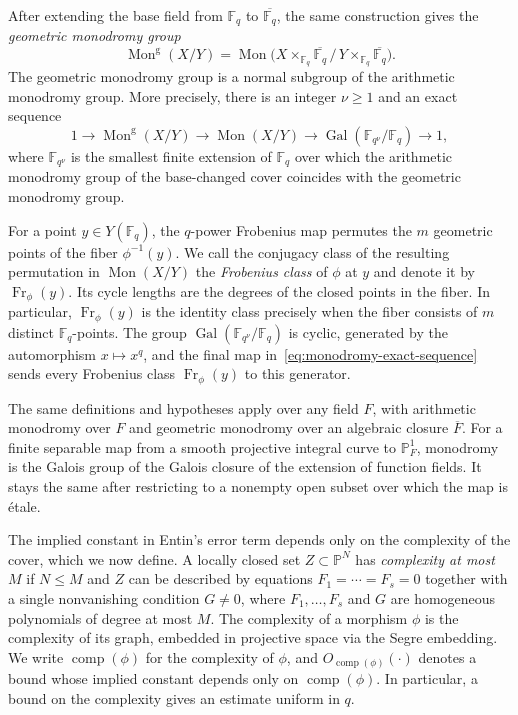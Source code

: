 \documentclass[12pt,reqno]{amsart}
\theoremstyle{definition}
\theoremstyle{remark}
\newcommand{\bF}{\mathbb{F}}
\newcommand{\Fq}{\mathbb{F}_q}
\newcommand{\bP}{\mathbb{P}}
\begin{document}
After extending the base field from $\Fq$ to $\overline{\Fq}$, the same construction gives the \emph{geometric monodromy group}
\[
\operatorname{Mon}^{\mathrm{g}}(X/Y)
=
\operatorname{Mon}\bigl(X\times_{\Fq}\overline{\Fq}\,/\,Y\times_{\Fq}\overline{\Fq}\bigr).
\]
The geometric monodromy group is a normal subgroup of the arithmetic monodromy group. More precisely, there is an integer $\nu\geq 1$ and an exact sequence
\begin{equation}\label{eq:monodromy-exact-sequence}
1\longrightarrow \operatorname{Mon}^{\mathrm{g}}(X/Y)
\longrightarrow \operatorname{Mon}(X/Y)
\longrightarrow \operatorname{Gal}(\bF_{q^\nu}/\Fq)
\longrightarrow 1,
\end{equation}
where $\bF_{q^\nu}$ is the smallest finite extension of $\Fq$ over which the arithmetic monodromy group of the base-changed cover coincides with the geometric monodromy group.

For a point $y\in Y(\Fq)$, the $q$-power Frobenius map permutes the $m$ geometric points of the fiber $\phi^{-1}(y)$. We call the conjugacy class of the resulting permutation in $\operatorname{Mon}(X/Y)$ the \emph{Frobenius class} of $\phi$ at $y$ and denote it by $\operatorname{Fr}_{\phi}(y)$. Its cycle lengths are the degrees of the closed points in the fiber. In particular, $\operatorname{Fr}_{\phi}(y)$ is the identity class precisely when the fiber consists of $m$ distinct $\Fq$-points. The group $\operatorname{Gal}(\bF_{q^\nu}/\Fq)$ is cyclic, generated by the automorphism $x\mapsto x^q$, and the final map in~\eqref{eq:monodromy-exact-sequence} sends every Frobenius class $\operatorname{Fr}_{\phi}(y)$ to this generator. 

The same definitions and hypotheses apply over any field $F$, with arithmetic monodromy over $F$ and geometric monodromy over an algebraic closure $\overline F$. For a finite separable map from a smooth projective integral curve to $\bP^1_F$, monodromy is the Galois group of the Galois closure of the extension of function fields. It stays the same after restricting to a nonempty open subset over which the map is \'etale.

The implied constant in Entin's error term depends only on the complexity of the cover, which we now define. A locally closed set $Z\subset\bP^N$ has \emph{complexity at most $M$} if $N\leq M$ and $Z$ can be described by equations $F_1=\cdots=F_s=0$ together with a single nonvanishing condition $G\neq 0$, where $F_1,\ldots,F_s$ and $G$ are homogeneous polynomials of degree at most $M$. The complexity of a morphism $\phi$ is the complexity of its graph, embedded in projective space via the Segre embedding. We write $\operatorname{comp}(\phi)$ for the complexity of $\phi$, and $O_{\operatorname{comp}(\phi)}(\cdot)$ denotes a bound whose implied constant depends only on $\operatorname{comp}(\phi)$. In particular, a bound on the complexity gives an estimate uniform in $q$.
\end{document}
